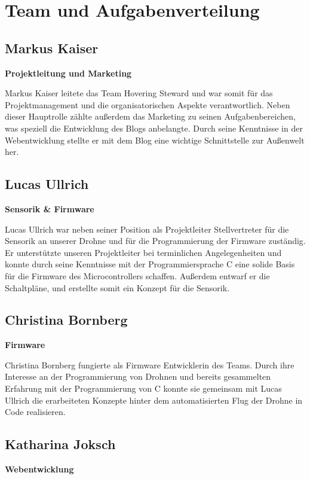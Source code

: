 \section{Team und Aufgabenverteilung}
  \subsection*{Markus Kaiser}
  \textbf{Projektleitung und Marketing}

  Markus Kaiser leitete das Team Hovering Steward und war somit für das Projektmanagement und
  die organisatorischen Aspekte verantwortlich. Neben dieser Hauptrolle zählte außerdem das Marketing
  zu seinen Aufgabenbereichen, was speziell die Entwicklung des Blogs anbelangte. Durch seine Kenntnisse
  in der Webentwicklung stellte er mit dem Blog eine wichtige Schnittstelle zur Außenwelt her.

  \subsection*{Lucas Ullrich}
  \textbf{Sensorik \& Firmware}

  Lucas Ullrich war neben seiner Position als Projektleiter Stellvertreter für die Sensorik an unserer Drohne und
  für die Programmierung der Firmware zuständig. Er unterstützte unseren Projektleiter bei terminlichen Angelegenheiten
  und konnte durch seine Kenntnisse mit der Programmiersprache C eine solide Basis für die Firmware des Microcontrollers schaffen.
  Außerdem entwarf er die Schaltpläne, und erstellte somit ein Konzept für die Sensorik.

  \subsection*{Christina Bornberg}
  \textbf{Firmware}

  Christina Bornberg fungierte als Firmware Entwicklerin des Teams. Durch ihre Interesse an der Programmierung von Drohnen
  und bereits gesammelten Erfahrung mit der Programmierung von C konnte sie gemeinsam mit Lucas Ullrich die erarbeiteten Konzepte hinter
  dem automatisierten Flug der Drohne in Code realisieren.

  \subsection*{Katharina Joksch}
  \textbf{Webentwicklung}

